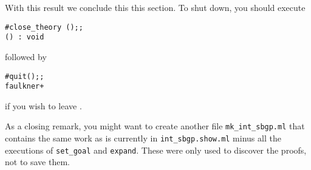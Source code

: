 With this result we conclude this this section.  To shut down, you
should 
execute
\begin{session}
\begin{verbatim}
#close_theory ();;
() : void
\end{verbatim}
\end{session}
followed by
\begin{session}
\begin{verbatim}
#quit();;
faulkner+
\end{verbatim}
\end{session}
if you wish to leave \HOL.

As a closing remark, you might want to create another file
{\small\verb+mk_int_sbgp.ml+} that contains the same work as is
currently in {\small\verb+int_sbgp.show.ml+} minus all the
executions of {\small\verb+set_goal+} and
{\small\verb+expand+}.  These were only used to discover the
proofs, not to save them. 

